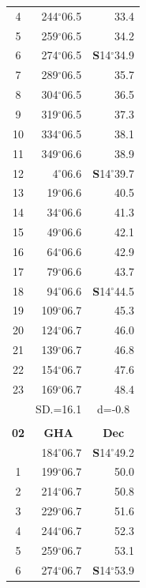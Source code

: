 \documentclass[10pt, a4paper]{report}
\begin{document}
\begin{scriptsize}
\begin{tabular*}{0.2\textwidth}[t]{@{\extracolsep{\fill}}|c|rr|}
4 & 244$^\circ$06.5 & 33.4\\
5 & 259$^\circ$06.5 & 34.2\\[2Pt]
6 & 274$^\circ$06.5 & \textbf{S}14$^\circ$34.9\\
7 & 289$^\circ$06.5 & 35.7\\
8 & 304$^\circ$06.5 & 36.5\\
9 & 319$^\circ$06.5 & \raisebox{0.24ex}{\boldmath$\cdot$~\boldmath$\cdot$~~}37.3\\
10 & 334$^\circ$06.5 & 38.1\\
11 & 349$^\circ$06.6 & 38.9\\[2Pt]
12 & 4$^\circ$06.6 & \textbf{S}14$^\circ$39.7\\
13 & 19$^\circ$06.6 & 40.5\\
14 & 34$^\circ$06.6 & 41.3\\
15 & 49$^\circ$06.6 & \raisebox{0.24ex}{\boldmath$\cdot$~\boldmath$\cdot$~~}42.1\\
16 & 64$^\circ$06.6 & 42.9\\
17 & 79$^\circ$06.6 & 43.7\\[2Pt]
18 & 94$^\circ$06.6 & \textbf{S}14$^\circ$44.5\\
19 & 109$^\circ$06.7 & 45.3\\
20 & 124$^\circ$06.7 & 46.0\\
21 & 139$^\circ$06.7 & \raisebox{0.24ex}{\boldmath$\cdot$~\boldmath$\cdot$~~}46.8\\
22 & 154$^\circ$06.7 & 47.6\\
23 & 169$^\circ$06.7 & 48.4\\
\hline
\rule{0pt}{2.4ex} & \multicolumn{1}{c}{SD.=16.1} & \multicolumn{1}{c|}{d=-0.8}\\
\hline
\multicolumn{1}{c}{}\\[-0.5ex]\hline
\multicolumn{1}{|c|}{\rule{0pt}{2.6ex}\textbf{02}} & \multicolumn{1}{c}{\textbf{GHA}} & \multicolumn{1}{c|}{\textbf{Dec}}\\
\hline\rule{0pt}{2.6ex}\noindent
0 & 184$^\circ$06.7 & \textbf{S}14$^\circ$49.2\\
1 & 199$^\circ$06.7 & 50.0\\
2 & 214$^\circ$06.7 & 50.8\\
3 & 229$^\circ$06.7 & \raisebox{0.24ex}{\boldmath$\cdot$~\boldmath$\cdot$~~}51.6\\
4 & 244$^\circ$06.7 & 52.3\\
5 & 259$^\circ$06.7 & 53.1\\[2Pt]
6 & 274$^\circ$06.7 & \textbf{S}14$^\circ$53.9\\

\end{tabular*}
\end{scriptsize}
\end{document}
